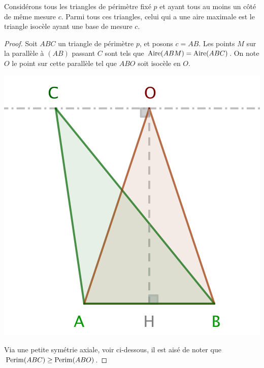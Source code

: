 

\begin{fact}\label{iso-tri-one-side-fixed}
	Considérons tous les triangles de périmètre fixé $p$ et ayant tous au moins un côté de même mesure $c$. Parmi tous ces triangles, celui qui a une aire maximale est le triangle isocèle ayant une base de mesure $c$.
\end{fact}


\begin{proof}
	Soit $ABC$ un triangle de périmètre $p$, et posons $c = AB$. Les points $M$ sur la parallèle à $(AB)$ passant $C$ sont tels que $\mathrm{Aire}(ABM) = \mathrm{Aire}(ABC)$. On note $O$ le point sur cette parallèle tel que $ABO$ soit isocèle en $O$.

	\begin{center}
		\includegraphics[scale=.4]{content/triangle/triangle.png}
	\end{center}

	Via une petite symétrie axiale, voir ci-dessous, il est aisé de noter que $\mathrm{Perim}(ABC) \geq \mathrm{Perim}(ABO)$.
	

\end{proof}
